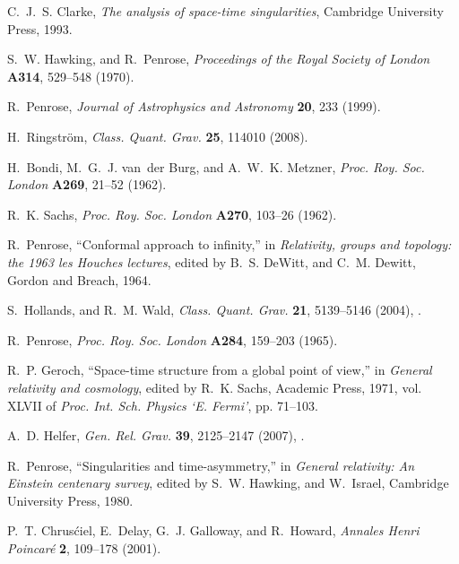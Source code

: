 \documentclass[
%
draft    %
,numberedheadings 
,bibliocites
  ]
  {aipproc}
\begin{document}
\begin{thebibliography}{57}
C.~J.~S. Clarke, \emph{The analysis of space-time singularities}, Cambridge
  University Press, 1993.

S.~W. Hawking, and R.~Penrose, \emph{Proceedings of the Royal Society of
  London} \textbf{A314}, 529--548 (1970).

R.~Penrose, \emph{Journal of Astrophysics and Astronomy} \textbf{20}, 233
  (1999).

H.~Ringstr\"om, \emph{Class. Quant. Grav.} \textbf{25}, 114010 (2008).

H.~Bondi, M.~G.~J. van~der Burg, and A.~W.~K. Metzner, \emph{Proc. Roy. Soc.
  London} \textbf{A269}, 21--52 (1962).

R.~K. Sachs, \emph{Proc. Roy. Soc. London} \textbf{A270}, 103--26 (1962).

R.~Penrose, \enquote{Conformal approach to infinity,} in \emph{Relativity,
  groups and topology: the 1963 les Houches lectures}, edited by B.~S. DeWitt,
  and C.~M. Dewitt, Gordon and Breach, 1964.

S.~Hollands, and R.~M. Wald, \emph{Class. Quant. Grav.} \textbf{21}, 5139--5146
  (2004), .

R.~Penrose, \emph{Proc. Roy. Soc. London} \textbf{A284}, 159--203 (1965).

R.~P. Geroch, \enquote{Space-time structure from a global point of view,} in
  \emph{General relativity and cosmology}, edited by R.~K. Sachs, Academic
  Press, 1971, vol. XLVII of \emph{Proc. Int. Sch. Physics `E. Fermi'}, pp.
  71--103.

A.~D. Helfer, \emph{Gen. Rel. Grav.} \textbf{39}, 2125--2147 (2007),
  .

R.~Penrose, \enquote{Singularities and time-asymmetry,} in \emph{General
  relativity: An Einstein centenary survey}, edited by S.~W. Hawking, and
  W.~Israel, Cambridge University Press, 1980.

P.~T. Chrus\'ciel, E.~Delay, G.~J. Galloway, and R.~Howard, \emph{Annales Henri
  Poincar\'e} \textbf{2}, 109--178 (2001).


\end{thebibliography}
\end{document}
